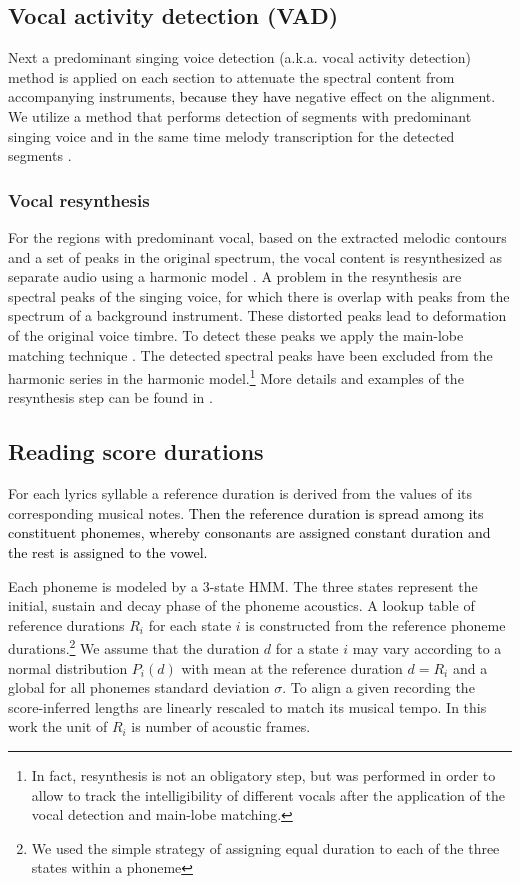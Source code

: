 \documentclass{article}
\begin{document}
\subsection{Vocal activity detection (VAD)}

Next a predominant singing voice detection (a.k.a. vocal activity
detection) method is applied on each section
to attenuate the spectral content from accompanying instruments, \textcolor{black}{because
they have} negative effect on the alignment. We utilize a method that performs detection
of segments with predominant singing voice and in the same time melody
transcription for the detected segments \cite{salamon2012melody}. 

\subsubsection{Vocal resynthesis}

For the regions with predominant vocal, based on the extracted melodic
contours and a set of peaks in the original spectrum, the vocal content is resynthesized as separate audio using
a harmonic model \cite{Serra89asystem}. 
A problem in the resynthesis are spectral peaks of the singing voice, for which there is overlap with peaks from the spectrum of a background instrument. 
These distorted peaks lead to deformation of the original voice timbre. To detect these peaks we apply the main-lobe matching technique \cite{rao2010vocal}. The detected spectral peaks have been excluded from the harmonic series in the harmonic model.\footnote{In fact, resynthesis is not an obligatory step, but was performed in order to allow to track the intelligibility of different vocals after the application of the vocal detection and main-lobe matching. }   More details and examples of the resynthesis
step can be found in \cite{dzhambazov2014automatic}.

\subsection{Reading score durations\label{sub:Reading-score-durations}}

For each lyrics syllable a reference duration is derived from the
values of its corresponding musical notes. \textcolor{black}{Then
the reference duration is spread among its constituent phonemes, whereby
consonants are assigned constant duration and the rest is assigned
to the vowel.}

Each phoneme is modeled by a 3-state HMM. The three states represent the initial, sustain and decay phase of the phoneme acoustics.  A lookup
table of reference durations $R_{i}$ for each state $i$ is constructed from the reference phoneme durations.\footnote{We used the simple strategy of assigning equal duration to each of the three states within a phoneme} We assume
that the duration $d$ for a state $i$ may vary according to a normal
distribution $P_{i}(d)$ with mean at the reference duration $d=R_{i}$
and a global for all phonemes standard deviation $\sigma$. To align a given recording the score-inferred
lengths are linearly rescaled to match its musical tempo. In this
work the unit of $R_{i}$ is number of acoustic frames. 
\end{document}
